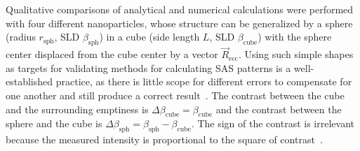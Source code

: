 \documentclass[preprint, 5p, times, twocolumn]{elsarticle}
\begin{document}
Qualitative comparisons of analytical and numerical calculations were performed with four different nanoparticles, whose structure can be generalized by a sphere (radius $r_{\text{sph}}$, SLD $\beta_{\text{sph}}$) in a cube (side length $L$, SLD $\beta_{\text{cube}}$) with the sphere center displaced from the cube center by a vector $\vec{R}_{\text{ecc}}$. Using such simple shapes as targets for validating methods for calculating SAS patterns is a well-established practice, as there is little scope for different errors to compensate for one another and still produce a correct result~\cite{schmidt2007simulation, deumer2022small, larsen2023shape2sas}. The contrast between the cube and the surrounding emptiness is $\Delta\beta_{\text{cube}} = \beta_{\text{cube}}$ and the contrast between the sphere and the cube is $\Delta\beta_{\text{sph}} = \beta_{\text{sph}} - \beta_{\text{cube}}$. The sign of the contrast is irrelevant because the measured intensity is proportional to the square of contrast~\cite{jeffries2021small}.
\end{document}
